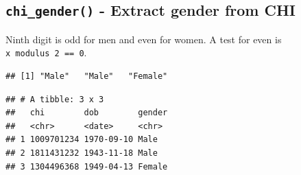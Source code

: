 \documentclass[
]{book}
\newenvironment{Shaded}{\begin{snugshade}}{\end{snugshade}}
\newcommand{\CommentTok}[1]{\textcolor[rgb]{0.56,0.35,0.01}{\textit{#1}}}
\newcommand{\ControlFlowTok}[1]{\textcolor[rgb]{0.13,0.29,0.53}{\textbf{#1}}}
\newcommand{\DataTypeTok}[1]{\textcolor[rgb]{0.13,0.29,0.53}{#1}}
\newcommand{\DecValTok}[1]{\textcolor[rgb]{0.00,0.00,0.81}{#1}}
\newcommand{\KeywordTok}[1]{\textcolor[rgb]{0.13,0.29,0.53}{\textbf{#1}}}
\newcommand{\NormalTok}[1]{#1}
\newcommand{\OperatorTok}[1]{\textcolor[rgb]{0.81,0.36,0.00}{\textbf{#1}}}
\newcommand{\StringTok}[1]{\textcolor[rgb]{0.31,0.60,0.02}{#1}}
\begin{document}
\hypertarget{chi_gender---extract-gender-from-chi}{%
\subsection{\texorpdfstring{\texttt{chi\_gender()} - Extract gender from CHI}{chi\_gender() - Extract gender from CHI}}\label{chi_gender---extract-gender-from-chi}}

Ninth digit is odd for men and even for women.
A test for even is \texttt{x\ modulus\ 2\ ==\ 0}.

\begin{Shaded}
\end{Shaded}

\begin{verbatim}
## [1] "Male"   "Male"   "Female"
\end{verbatim}

\begin{Shaded}
\end{Shaded}

\begin{verbatim}
## # A tibble: 3 x 3
##   chi        dob        gender
##   <chr>      <date>     <chr> 
## 1 1009701234 1970-09-10 Male  
## 2 1811431232 1943-11-18 Male  
## 3 1304496368 1949-04-13 Female
\end{verbatim}
\end{document}
